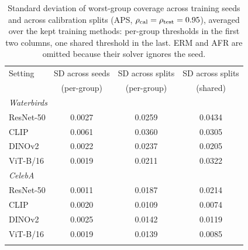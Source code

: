 \begin{table}[!ht]
\centering
\caption{Standard deviation of worst-group coverage across training seeds and across calibration splits (APS, $\rho_{\mathrm{cal}}=\rho_{\mathrm{test}}=0.95$), averaged over the kept training methods: per-group thresholds in the first two columns, one shared threshold in the last. ERM and AFR are omitted because their solver ignores the seed.}
\label{tab:variance}
\footnotesize
\setlength{\tabcolsep}{3.5pt}
\begin{tabular}{lccc}
\toprule
Setting & SD across seeds & SD across splits & SD across splits \\
 & (per-group) & (per-group) & (shared) \\
\midrule
\multicolumn{4}{l}{\emph{Waterbirds}} \\
ResNet-50 & 0.0027 & 0.0259 & 0.0434 \\
CLIP & 0.0061 & 0.0360 & 0.0305 \\
DINOv2 & 0.0022 & 0.0237 & 0.0205 \\
ViT-B/16 & 0.0019 & 0.0211 & 0.0322 \\
\multicolumn{4}{l}{\emph{CelebA}} \\
ResNet-50 & 0.0011 & 0.0187 & 0.0214 \\
CLIP & 0.0020 & 0.0109 & 0.0074 \\
DINOv2 & 0.0025 & 0.0142 & 0.0119 \\
ViT-B/16 & 0.0019 & 0.0139 & 0.0085 \\
\botrule
\end{tabular}
\end{table}

